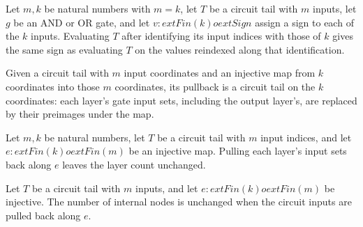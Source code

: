 \begin{theorem}
\label{FABL.CircuitTail.eval_castInput}
\leanok
{}
Let $m,k$ be natural numbers with $m=k$, let $T$ be a circuit tail with $m$ inputs, let
$g$ be an AND or OR gate, and let $v:	ext{Fin}(k)	o	ext{Sign}$ assign a sign to each of
the $k$ inputs. Evaluating $T$ after identifying its input indices with those of $k$
gives the same sign as evaluating $T$ on the values reindexed along that identification.
\end{theorem}

\begin{definition}
\label{FABL.CircuitTail.pullInputs}
\leanok
{}
Given a circuit tail with $m$ input coordinates and an injective map from $k$
coordinates into those $m$ coordinates, its pullback is a circuit tail on the $k$
coordinates: each layer's gate input sets, including the output layer's, are replaced by
their preimages under the map.
\end{definition}

\begin{theorem}
\label{FABL.CircuitTail.layerCount_pullInputs}
\leanok
{}
Let $m,k$ be natural numbers, let $T$ be a circuit tail with $m$ input indices, and let
$e:	ext{Fin}(k)	o	ext{Fin}(m)$ be an injective map. Pulling each layer's input sets back
along $e$ leaves the layer count unchanged.
\end{theorem}

\begin{theorem}
\label{FABL.CircuitTail.internalNodeCount_pullInputs}
\leanok
{}
Let $T$ be a circuit tail with $m$ inputs, and let $e:	ext{Fin}(k)	o	ext{Fin}(m)$ be
injective. The number of internal nodes is unchanged when the circuit inputs are pulled
back along $e$.
\end{theorem}


